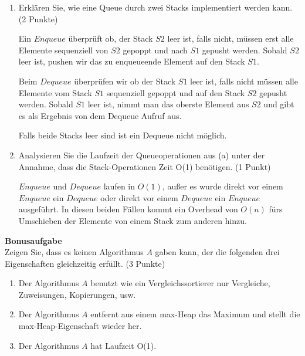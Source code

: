 \documentclass[ngerman,landscape,twocolumn]{adtexsheet}
\begin{document}
\begin{question}
    \begin{enumerate}
        \item Erklären Sie, wie eine Queue durch zwei Stacks implementiert werden kann. (2 Punkte)
        
        Ein $Enqueue$ überprüft ob, der Stack $S2$ leer ist, falls nicht, müssen erst alle Elemente sequenziell von $S2$ gepoppt und nach $S1$ gepusht werden. Sobald $S2$ leer ist, pushen wir das zu enqueueende Element auf den Stack $S1$.
        
        Beim $Dequeue$ überprüfen wir ob der Stack $S1$ leer ist, falls nicht müssen alle Elemente vom Stack $S1$ sequenziell gepoppt und auf den Stack $S2$ gepusht werden. Sobald $S1$ leer ist, nimmt man das oberste Element aus $S2$ und gibt es als Ergebnis von dem Dequeue Aufruf aus.
        
        Falls beide Stacks leer sind ist ein Dequeue nicht möglich.
        
        \item Analysieren Sie die Laufzeit der Queueoperationen aus (a) unter der Annahme, dass die Stack-Operationen Zeit O(1) benötigen. (1 Punkt)
        
        $Enqueue$ und $Dequeue$ laufen in $O(1)$, außer es wurde direkt vor einem $Enqueue$ ein $Dequeue$ oder direkt vor einem $Dequeue$ ein $Enqueue$ ausgeführt. In diesen beiden Fällen kommt ein Overhead von $O(n)$ fürs Umschieben der Elemente von einem Stack zum anderen hinzu.
    \end{enumerate} 
\end{question}


\begin{question}
    \textbf{Bonusaufgabe}\\
    Zeigen Sie, dass es keinen Algorithmus $A$ gaben kann, der die folgenden drei Eigenschaften gleichzeitig erfüllt. (3 Punkte)
    \begin{enumerate}
        \item Der Algorithmus $A$ benutzt wie ein Vergleichssortierer nur Vergleiche, Zuweisungen, Kopierungen, usw.
        \item Der Algorithmus $A$ entfernt aus einem max-Heap das Maximum und stellt die         max-Heap-Eigenschaft wieder her.
        \item Der Algorithmus $A$ hat Laufzeit O(1).
    \end{enumerate}
\end{question}
\end{document}
